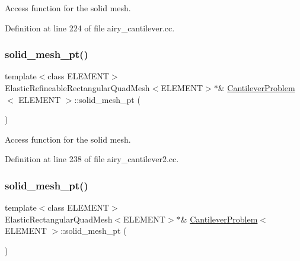 Access function for the solid mesh. 



Definition at line 224 of file airy\+\_\+cantilever.\+cc.

\mbox{\label{classCantileverProblem_a26843782873897ee5e45647d17204b86}} 
\subsubsection{\texorpdfstring{solid\+\_\+mesh\+\_\+pt()}{solid\_mesh\_pt()}\hspace{0.1cm}{\footnotesize\ttfamily [2/3]}}
{\footnotesize\ttfamily template$<$class E\+L\+E\+M\+E\+NT$>$ \\
Elastic\+Refineable\+Rectangular\+Quad\+Mesh$<$E\+L\+E\+M\+E\+NT$>$$\ast$\& \hyperlink{classCantileverProblem}{Cantilever\+Problem}$<$ E\+L\+E\+M\+E\+NT $>$\+::solid\+\_\+mesh\+\_\+pt (\begin{DoxyParamCaption}{ }\end{DoxyParamCaption})\hspace{0.3cm}{\ttfamily [inline]}}



Access function for the solid mesh. 



Definition at line 238 of file airy\+\_\+cantilever2.\+cc.

\mbox{\label{classCantileverProblem_a63d315bcebba1a439e4b5ec0fec5b6ab}} 
\subsubsection{\texorpdfstring{solid\+\_\+mesh\+\_\+pt()}{solid\_mesh\_pt()}\hspace{0.1cm}{\footnotesize\ttfamily [3/3]}}
{\footnotesize\ttfamily template$<$class E\+L\+E\+M\+E\+NT$>$ \\
Elastic\+Rectangular\+Quad\+Mesh$<$E\+L\+E\+M\+E\+NT$>$$\ast$\& \hyperlink{classCantileverProblem}{Cantilever\+Problem}$<$ E\+L\+E\+M\+E\+NT $>$\+::solid\+\_\+mesh\+\_\+pt (\begin{DoxyParamCaption}{ }\end{DoxyParamCaption})\hspace{0.3cm}{\ttfamily [inline]}}



